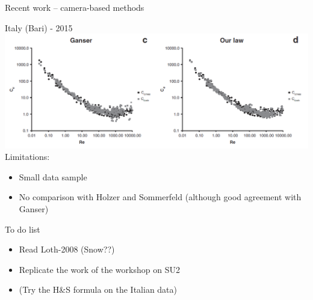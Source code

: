 \documentclass[11pt]{beamer}
\begin{document}
	\begin{frame}{Recent work -- camera-based methods}
		\begin{block}{Italy (Bari) - 2015}
			\centering
			\includegraphics[width=\linewidth]{ComparisonItaly.png}\\
			\flushleft
			Limitations:
			\begin{itemize}
				\item Small data sample
				\item No comparison with Holzer and Sommerfeld (although good agreement with Ganser)
			\end{itemize} 
		\end{block}
	\end{frame}

	\begin{frame}{To do list}
		\begin{itemize}
			\item Read Loth-2008 (Snow??)
			\item Replicate the work of the workshop on SU2
			\item (Try the H\&S formula on the Italian data)
		\end{itemize}
	\end{frame}
\end{document}
